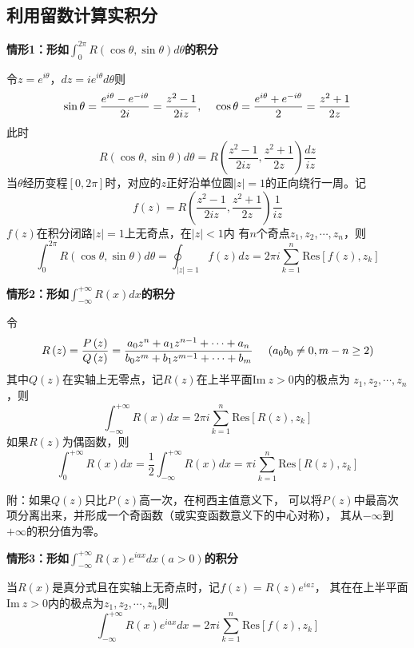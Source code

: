 \documentclass[a4paper,12pt]{article}
\begin{document}
\subsection{利用留数计算实积分}

\noindent
\textbf{情形1：形如$\int_0^{2\pi}R\left(\cos\theta,\sin\theta\right)d\theta$的积分}

令$z=e^{i\theta}$，$dz=ie^{i\theta}d\theta$则
$$
\sin\theta=\frac{e^{i\theta}-e^{-i\theta}}{2i}=\frac{z^2-1}{2iz},\kern 12pt
\cos\theta=\frac{e^{i\theta}+e^{-i\theta}}{2}=\frac{z^2+1}{2z}
$$
此时
$$
R\left(\cos\theta,\sin\theta\right)d\theta=
R\left(\frac{z^2-1}{2iz},\frac{z^2+1}{2z}\right)\frac{dz}{iz}
$$
当$\theta$经历变程$\left[0,2\pi\right]$时，对应的$z$正好沿单位圆$\left|z\right|=1$的正向绕行一周。记
$$
f\left(z\right)=R\left(\frac{z^2-1}{2iz},\frac{z^2+1}{2z}\right)\frac1{iz}
$$
$f\left(z\right)$在积分闭路$\left|z\right|=1$上无奇点，在$\left|z\right|<1$内
有$n$个奇点$z_1,z_2,\cdots,z_n$，则
$$
\int_0^{2\pi}R\left(\cos\theta,\sin\theta\right)d\theta=
\oint_{\left|z\right|=1}f\left(z\right)dz=
2\pi i\sum_{k=1}^n\text{Res}\left[f\left(z\right),z_k\right]
$$

\noindent
\textbf{情形2：形如$\int_{-\infty}^{+\infty}R\left(x\right)dx$的积分}

令
$$
R\left(z\right)=\frac{P\left(z\right)}{Q\left(z\right)}=
\frac{a_0z^n+a_1z^{n-1}+\cdots+a_n}{b_0z^m+b_1z^{m-1}+\cdots+b_m}
\kern 12pt \left(a_0b_0\ne0,m-n\ge2\right)
$$
其中$Q\left(z\right)$在实轴上无零点，记$R\left(z\right)$在上半平面$\text{Im}\ z>0$内的极点为
$z_1,z_2,\cdots,z_n$，则
$$
\int_{-\infty}^{+\infty}R\left(x\right)dx=2\pi i\sum_{k=1}^n\text{Res}\left[R\left(z\right),z_k\right]
$$
如果$R\left(z\right)$为偶函数，则
$$
\int_0^{+\infty}R\left(x\right)dx=\frac12\int_{-\infty}^{+\infty}R\left(x\right)dx
=\pi i\sum_{k=1}^n\text{Res}\left[R\left(z\right),z_k\right]
$$

附：如果$Q\left(z\right)$只比$P\left(z\right)$高一次，在柯西主值意义下，
可以将$P\left(z\right)$中最高次项分离出来，并形成一个奇函数（或实变函数意义下的中心对称），
其从$-\infty$到$+\infty$的积分值为零。

\noindent
\textbf{情形3：形如$\int_{-\infty}^{+\infty}R\left(x\right)e^{iax}dx\left(a>0\right)$的积分}

当$R\left(x\right)$是真分式且在实轴上无奇点时，记$f\left(z\right)=R\left(z\right)e^{iaz}$，
其在在上半平面$\text{Im}\ z>0$内的极点为$z_1,z_2,\cdots,z_n$则
$$
\int_{-\infty}^{+\infty}R\left(x\right)e^{iax}dx=
2\pi i\sum_{k=1}^n\text{Res}\left[f\left(z\right),z_k\right]
$$
\end{document}
